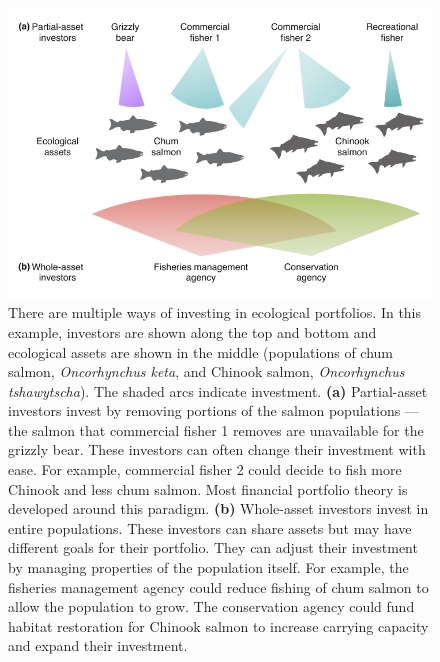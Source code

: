 \begin{figure}[htbp]
\centering \includegraphics[width=5in]{salmon-portfolios.pdf} \caption{There
  are multiple ways of investing in ecological portfolios. In this example,
  investors are shown along the top and bottom and ecological assets are shown
  in the middle (populations of chum salmon, \textit{Oncorhynchus keta}, and
  Chinook salmon, \textit{Oncorhynchus tshawytscha}). The shaded arcs indicate
  investment. \textbf{(a)} Partial-asset investors invest by removing portions
  of the salmon populations --- the salmon that commercial fisher 1 removes are
  unavailable for the grizzly bear. These investors can often change their
  investment with ease. For example, commercial fisher 2 could decide to fish
  more Chinook and less chum salmon. Most financial portfolio theory is
  developed around this paradigm. \textbf{(b)} Whole-asset investors invest in
  entire populations. These investors can share assets but may have different
  goals for their portfolio. They can adjust their investment by managing
  properties of the population itself. For example, the fisheries management
  agency could reduce fishing of chum salmon to allow the population to grow.
  The conservation agency could fund habitat restoration for Chinook salmon to
  increase carrying capacity and expand their investment.}
\label{fig:salmonport}
\end{figure}

